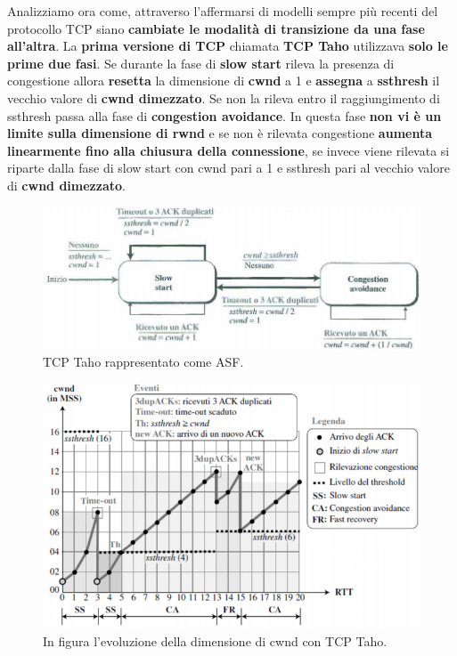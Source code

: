 \documentclass[11pt,a4paper]{article}
\theoremstyle{definition}
\begin{document}
Analizziamo ora come, attraverso l'affermarsi di modelli sempre più recenti del protocollo TCP siano \textbf{cambiate le modalità di transizione da una fase all'altra}.
La \textbf{prima versione di TCP} chiamata \textbf{TCP Taho} utilizzava \textbf{solo le prime due fasi}. Se durante la fase di \textbf{slow start} rileva la presenza di congestione allora \textbf{resetta} la dimensione di \textbf{cwnd} a 1 e \textbf{assegna} a \textbf{ssthresh} il vecchio valore di \textbf{cwnd dimezzato}. Se non la rileva entro il raggiungimento di ssthresh passa alla fase di \textbf{congestion avoidance}. In questa fase \textbf{non vi è un limite sulla dimensione di rwnd} e se non è rilevata congestione \textbf{aumenta linearmente fino alla chiusura della connessione}, se invece viene rilevata si riparte dalla fase di slow start con cwnd pari a 1 e ssthresh pari al vecchio valore di \textbf{cwnd dimezzato}.
\begin{figure}[!h]
	\includegraphics[scale=0.3]{Immagini/Taho.png}
	\centering
	\caption{TCP Taho rappresentato come ASF.}
\end{figure}\newline
\begin{figure}[!h]
	\includegraphics[scale=0.34]{Immagini/Taho2.png}
	\centering
	\caption{In figura l'evoluzione della dimensione di cwnd con TCP Taho.}
\end{figure}
\end{document}
